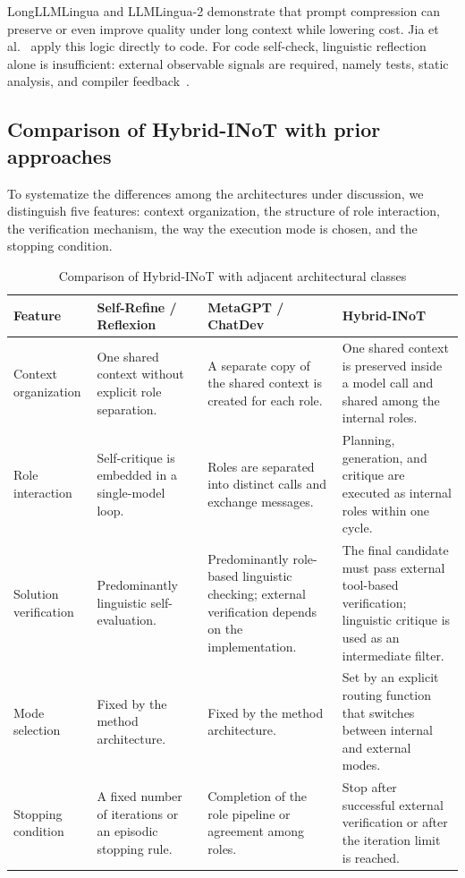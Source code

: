 LongLLMLingua and LLMLingua-2 \cite{jiang2023longllmlingua,pan2024llmlingua2} demonstrate that prompt compression can preserve or even improve quality under long context while lowering cost. Jia et al.~\cite{jia2026compression} apply this logic directly to code. For code self-check, linguistic reflection alone is insufficient: external observable signals are required, namely tests, static analysis, and compiler feedback~\cite{bi2024cocogen,su2025static,sepidband2025complexity}.

\subsection{Comparison of Hybrid-INoT with prior approaches}\label{subsec:distinction}

To systematize the differences among the architectures under discussion, we distinguish five features: context organization, the structure of role interaction, the verification mechanism, the way the execution mode is chosen, and the stopping condition.

\begin{table}[htbp]
\caption{Comparison of Hybrid-INoT with adjacent architectural classes}
\label{tab:distinction}
\centering
\begingroup
\begin{tabularx}{\textwidth}{@{}>{\raggedright\arraybackslash}p{2.8cm}>{\raggedright\arraybackslash}X>{\raggedright\arraybackslash}X>{\raggedright\arraybackslash}X@{}}
\toprule
Feature & Self-Refine / Reflexion & MetaGPT / ChatDev & Hybrid-INoT \\
\midrule
Context organization & One shared context without explicit role separation. & A separate copy of the shared context is created for each role. & One shared context is preserved inside a model call and shared among the internal roles. \\
Role interaction & Self-critique is embedded in a single-model loop. & Roles are separated into distinct calls and exchange messages. & Planning, generation, and critique are executed as internal roles within one cycle. \\
Solution verification & Predominantly linguistic self-evaluation. & Predominantly role-based linguistic checking; external verification depends on the implementation. & The final candidate must pass external tool-based verification; linguistic critique is used as an intermediate filter. \\
Mode selection & Fixed by the method architecture. & Fixed by the method architecture. & Set by an explicit routing function that switches between internal and external modes. \\
Stopping condition & A fixed number of iterations or an episodic stopping rule. & Completion of the role pipeline or agreement among roles. & Stop after successful external verification or after the iteration limit is reached. \\
\bottomrule
\end{tabularx}
\endgroup
\end{table}

